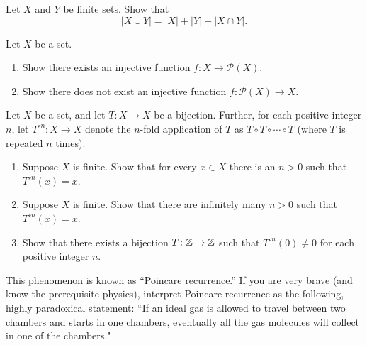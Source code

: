 \documentclass[../notes.tex]{subfiles}
\begin{document}
\begin{homework}
    Let $X$ and $Y$ be finite sets. Show that
    \[|X \cup Y| = |X| + |Y| - |X \cap Y|.\]
\end{homework}

\begin{homework} \label{prob:pset-is-bigger}
    Let $X$ be a set.
    \begin{enumerate}[label=(\alph*)]
        \item Show there exists an injective function $f\colon X\to\mathcal P(X)$.
        \item Show there does not exist an injective function $f\colon\mathcal P(X)\to X$.
    \end{enumerate}
\end{homework}

\begin{homework}
    Let $X$ be a set, and let $T\colon X \to X$ be a bijection. Further, for each positive integer $n$, let $T^{\circ n}\colon X \to X$ denote the $n$-fold application of $T$ as $T\circ T \circ \cdots \circ T$ (where $T$ is repeated $n$ times).
    \begin{enumerate}[label=(\alph*)]
        \item Suppose $X$ is finite. Show that for every $x \in X$ there is an $n > 0$ such that $T^{\circ n}(x) = x$.
        \item Suppose $X$ is finite. Show that there are infinitely many $n > 0$ such that $T^{\circ n}(x) = x$.
        \item Show that there exists a bijection $T\colon\mathbb Z\to\mathbb Z$ such that $T^{\circ n}(0)\ne0$ for each positive integer $n$.
    \end{enumerate}
    This phenomenon is known as ``Poincare recurrence.'' If you are very brave (and know the prerequisite physics), interpret Poincare recurrence as the following, highly paradoxical statement: ``If an ideal gas is allowed to travel between two chambers and starts in one chambers, eventually all the gas molecules will collect in one of the chambers."
\end{homework}
\end{document}
